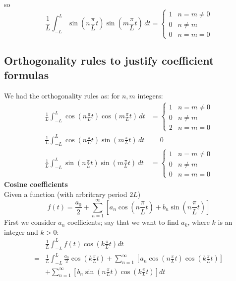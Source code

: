 \documentclass{report}
\begin{document}
so
\begin{equation*}
\frac{1}{L}\int^L_{-L}\sin\left(n\frac{\pi}{L}t\right)\sin\left(m\frac{\pi}{L}t\right)\,dt=\begin{cases}
1&n=m\neq0\\
0&n\neq m\\
0&n=m=0
\end{cases}
\end{equation*}
\newpage

\subsection{Orthogonality rules to justify coefficient formulas}
We had the orthogonality rules as: for
$n,m$ integers:
\begin{align*}
\frac{1}{L}\int^L_{-L}\cos\left(n\frac{\pi}{L}t\right)\cos\left(m\frac{\pi}{L}t\right)\,dt&=\begin{cases}
1&n=m\neq0\\
0&n\neq m\\
2&n=m=0
\end{cases}\\
\frac{1}{L}\int^L_{-L}\cos\left(n\frac{\pi}{L}t\right)\sin\left(m\frac{\pi}{L}t\right)\,dt&=0\\
\frac{1}{L}\int^L_{-L}\sin\left(n\frac{\pi}{L}t\right)\sin\left(m\frac{\pi}{L}t\right)\,dt&=\begin{cases}
1&n=m\neq0\\
0&n\neq m\\
0&n=m=0
\end{cases}
\end{align*}
\textbf{Cosine coefficients}\\
Given a function (with arbritrary period $2L$)
\begin{equation*}
f(t)=\frac{a_0}{2}+\sum^{\infty}_{n=1}\left[a_n\cos\left(n\frac{\pi}{L}t\right)+
b_n\sin\left(n\frac{\pi}{L}t\right)\right]
\end{equation*}
First we consider $a_n$ coefficients; say that we want to find $a_k$, where $k$ is an integer and $k>0$:
\begin{align*}
&\frac{1}{L}\int^L_{-L}f(t)\cos\left(k\frac{\pi}{L}t\right)
dt\\
=&\frac{1}{L}\int^L_{-L}\frac{a_0}{2}\cos\left(k\frac{\pi}{L}t\right)+
\sum^{\infty}_{n=1}\left[a_n\cos\left(n\frac{\pi}{L}t\right)\cos\left(k\frac{\pi}{L}t\right)\right]\\&+
\sum^{\infty}_{n=1}\left[b_n\sin\left(n\frac{\pi}{L}t\right)\cos\left(k\frac{\pi}{L}t\right)\right]dt
\end{align*}
\end{document}
